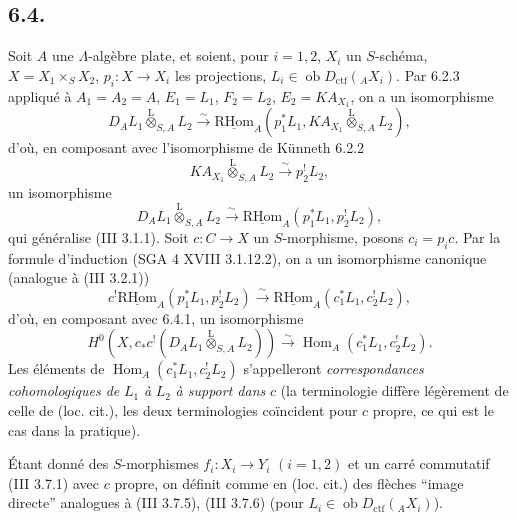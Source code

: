 \documentclass[11pt]{article}
\DeclareMathOperator{\Hom}{Hom}
\newcommand{\R}{\mathrm{R}}\newcommand{\RHomCore}{\mathrm{RHom}}
\providecommand{\RHom}{\RHomCore}
\providecommand{\uRHom}{\underline{\RHom}}
\providecommand{\lten}{\overset{\mathrm L}{\otimes}}
\providecommand{\Ob}{\operatorname{ob}}
\providecommand{\RHom}{\RHomCore}
\providecommand{\Hom}{\operatorname{Hom}}
\providecommand{\lten}{\overset{\mathrm L}{\otimes}}
\providecommand{\RHom}{\R\mathcal{H}om}
\providecommand{\lten}{\overset{\mathrm L}{\otimes}}
\providecommand{\Ob}{\operatorname{ob}}
\providecommand{\R}{\mathrm R}
\providecommand{\lten}{\overset{\mathrm L}{\otimes}}
\providecommand{\lten}{\overset{\mathrm L}{\otimes}}
\providecommand{\Ob}{\operatorname{Ob}}
\providecommand{\lten}{\overset{\mathrm L}{\otimes}}
\providecommand{\RHom}{\RHomCore}
\providecommand{\Hom}{\operatorname{Hom}}
\providecommand{\Ob}{\operatorname{ob}}
\providecommand{\Ob}{\operatorname{Ob}}
\providecommand{\lten}{\overset{\mathrm L}{\otimes}}
\begin{document}
\subsection*{6.4.}
Soit $A$ une $\Lambda$-algèbre plate, et soient, pour $i=1,2$, $X_i$ un $S$-schéma, $X=X_1\times_SX_2$, $p_i:X\to X_i$ les projections, $L_i\in\Ob D_{\mathrm{ctf}}({}_AX_i)$. Par 6.2.3 appliqué à $A_1=A_2=A$, $E_1=L_1$, $F_2=L_2$, $E_2=KA_{X_1}$, on a un isomorphisme
\[
D_A L_1\lten_{S,A}L_2
\xrightarrow{\sim}
\uRHom_A(p_1^*L_1,KA_{X_1}\lten_{S,A}L_2),
\]
d'où, en composant avec l'isomorphisme de Künneth 6.2.2
\[
KA_{X_1}\lten_{S,A}L_2\xrightarrow{\sim}p_2^!L_2,
\]
un isomorphisme
\begin{equation}
D_AL_1\lten_{S,A}L_2
\xrightarrow{\sim}
\uRHom_A(p_1^*L_1,p_2^!L_2),
\tag{6.4.1}
\end{equation}
qui généralise (III 3.1.1). Soit $c:C\to X$ un $S$-morphisme, posons $c_i=p_ic$. Par la formule d'induction (SGA 4 XVIII 3.1.12.2), on a un isomorphisme canonique (analogue à (III 3.2.1))
\begin{equation}
c^!\uRHom_A(p_1^*L_1,p_2^!L_2)
\xrightarrow{\sim}
\uRHom_A(c_1^*L_1,c_2^!L_2),
\tag{6.4.2}
\end{equation}
d'où, en composant avec 6.4.1, un isomorphisme
\begin{equation}
H^0(X,c_*c^!(D_AL_1\lten_{S,A}L_2))
\xrightarrow{\sim}
\Hom_A(c_1^*L_1,c_2^!L_2).
\tag{6.4.3}
\end{equation}
Les éléments de $\Hom_A(c_1^*L_1,c_2^!L_2)$ s'appelleront \emph{correspondances cohomologiques de} $L_1$ \emph{à} $L_2$ \emph{à support dans} $c$ (la terminologie diffère légèrement de celle de (loc. cit.), les deux terminologies coïncident pour $c$ propre, ce qui est le cas dans la pratique).

Étant donné des $S$-morphismes $f_i:X_i\to Y_i$ $(i=1,2)$ et un carré commutatif (III 3.7.1) avec $c$ propre, on définit comme en (loc. cit.) des flèches ``image directe'' analogues à (III 3.7.5), (III 3.7.6) (pour $L_i\in\Ob D_{\mathrm{ctf}}({}_AX_i)$).
\end{document}
